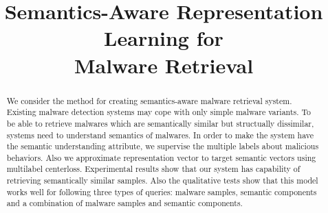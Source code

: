 \documentclass[sigconf, anonymous]{acmart}
\begin{document}
\title{Semantics-Aware Representation Learning for \\
Malware Retrieval} %

\begin{abstract}
%

We consider the method for creating semantics-aware malware retrieval system. Existing malware detection systems may cope with only simple malware variants. To be able to retrieve malwares which are semantically similar but structually dissimilar, systems need to understand semantics of malwares. In order to make the system have the semantic understanding attribute, we supervise the multiple labels about malicious behaviors. Also we approximate representation vector to target semantic vectors using multilabel centerloss. Experimental results show that our system has capability of retrieving semantically similar samples. Also the qualitative tests show that this model works well for following three types of queries: malware samples, semantic components and a combination of malware samples and semantic components.




\end{abstract}
\end{document}
